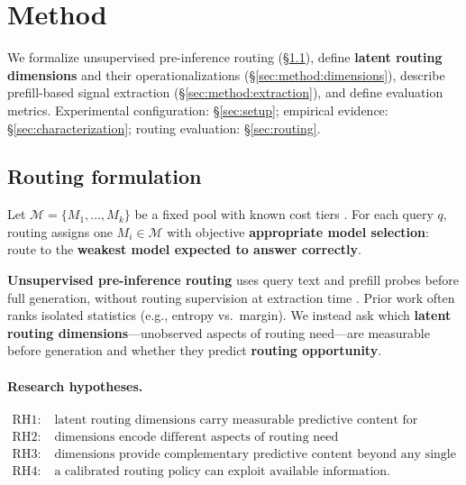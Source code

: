 
\section{Method}
\label{sec:method}

We formalize unsupervised pre-inference routing (\S\ref{sec:method:formulation}), define \textbf{latent routing dimensions} and their operationalizations (\S\ref{sec:method:dimensions}), describe prefill-based signal extraction (\S\ref{sec:method:extraction}), and define evaluation metrics.
Experimental configuration: \S\ref{sec:setup}; empirical evidence: \S\ref{sec:characterization}; routing evaluation: \S\ref{sec:routing}.

\subsection{Routing formulation}
\label{sec:method:formulation}

Let $\mathcal{M}=\{M_1,\ldots,M_k\}$ be a fixed pool with known cost tiers \citep{hu2024routerbench,ding2024hybrid}.
For each query $q$, routing assigns one $M_i \in \mathcal{M}$ with objective \textbf{appropriate model selection}: route to the \textbf{weakest model expected to answer correctly}.

\textbf{Unsupervised pre-inference routing} uses query text and prefill probes before full generation, without routing supervision at extraction time \citep{guha2024smoothie,mu2025ragrouting}.
Prior work often ranks isolated statistics (e.g., entropy vs.\ margin).
We instead ask which \textbf{latent routing dimensions}---unobserved aspects of routing need---are measurable before generation and whether they predict \textbf{routing opportunity}.

\paragraph{Research hypotheses.}
\begin{align*}
  \text{RH1:}& \;\text{latent routing dimensions carry measurable predictive content for routing opportunity} \\
  \text{RH2:}& \;\text{dimensions encode different aspects of routing need} \\
  \text{RH3:}& \;\text{dimensions provide complementary predictive content beyond any single dimension} \\
  \text{RH4:}& \;\text{a calibrated routing policy can exploit available information.}
\end{align*}

